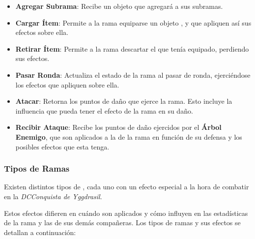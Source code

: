 \begin{itemize}
    \item \textbf{Agregar Subrama}: Recibe un objeto  que agregará a sus subramas.
    \item \textbf{Cargar Ítem}: Permite a la rama equiparse un objeto , y que apliquen así sus efectos sobre ella.
    \item \textbf{Retirar Ítem}: Permite a la rama descartar el  que tenía equipado, perdiendo sus efectos.
    \item \textbf{Pasar Ronda}: Actualiza el estado de la rama al pasar de ronda, ejerciéndose los efectos que apliquen sobre ella.
    \item \textbf{Atacar}: Retorna los puntos de daño que ejerce la rama. Esto incluye la influencia que pueda tener el efecto de la rama en su daño.
    \item \textbf{Recibir Ataque}: Recibe los puntos de daño ejercidos por el \textbf{Árbol Enemigo}, que son aplicados a la  de la rama en función de su defensa y los posibles efectos que esta tenga.
\end{itemize}
\subsubsection{Tipos de Ramas} \label{subsubsec:Tipos de Ramas}
Existen distintos tipos de , cada uno con un efecto especial a la hora de combatir en la \textit{DCConquista de Yggdrasil}. 

Estos efectos difieren en cuándo son aplicados y cómo influyen en las estadísticas de la rama y las de sus demás compañeras. Los tipos de ramas y sus efectos se detallan a continuación:

